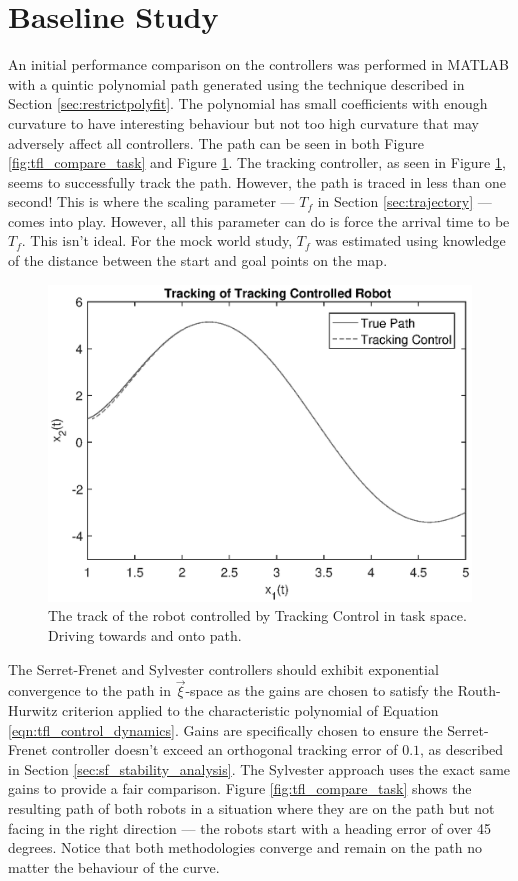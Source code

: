 \documentclass[oneside, 11pt]{book}
\begin{document}
\section{Baseline Study}
An initial performance comparison on the controllers was performed in MATLAB with a quintic polynomial path generated using the technique described in Section \ref{sec:restrictpolyfit}. The polynomial has small coefficients with enough curvature to have interesting behaviour but not too high curvature that may adversely affect all controllers. The path can be seen in both Figure \ref{fig:tfl_compare_task} and Figure \ref{fig:track}. The tracking controller, as seen in Figure \ref{fig:track}, seems to successfully track the path. However, the path is traced in less than one second! This is where the scaling parameter --- $T_f$ in Section \ref{sec:trajectory} --- comes into play. However, all this parameter can do is force the arrival time to be $T_f$. This isn't ideal. For the mock world study, $T_f$ was estimated using knowledge of the distance between the start and goal points on the map.
\begin{figure}[H]
    \centering
    \includegraphics{images/tracking_control.eps}
    \caption{The track of the robot controlled by Tracking Control in task space. Driving towards and onto path.}
    \label{fig:track}
\end{figure}
The Serret-Frenet and Sylvester controllers should exhibit exponential convergence to the path in $\vec{\xi}$-space as the gains are chosen to satisfy the Routh-Hurwitz criterion applied to the characteristic polynomial of Equation \ref{eqn:tfl_control_dynamics}. Gains are specifically chosen to ensure the Serret-Frenet controller doesn't exceed an orthogonal tracking error of $0.1$, as described in Section \ref{sec:sf_stability_analysis}. The Sylvester approach uses the exact same gains to provide a fair comparison. Figure \ref{fig:tfl_compare_task} shows the resulting path of both robots in a situation where they are on the path but not facing in the right direction --- the robots start with a heading error of over 45 degrees. Notice that both methodologies converge and remain on the path no matter the behaviour of the curve.
\end{document}
